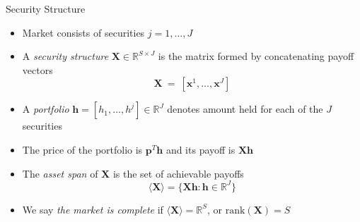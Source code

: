 \documentclass[aspectratio=1610]{beamer}
\newcommand{\eq}{\ =\ }
\newcommand{\bb}{\mathbb}
\begin{document}
\begin{frame}{Security Structure}
  \begin{itemize}
    \item Market consists of securities $j=1,\dots,J$
    \item A {\em security structure} $\bm X\in\bb R^{S\times J}$ is the matrix formed by concatenating payoff vectors
    $$\bm X \eq [\bm x^1, \dots, \bm x^J]$$

    \item A {\em portfolio} $\bm h = [h_1, \dots, h^j] \in \bb R^J$ denotes amount held for each of the $J$ securities
    \item The price of the portfolio is $\bm p^T \bm h$ and its payoff is $\bm{Xh}$
    \item The {\em asset span} of $\bm X$ is the set of achievable payoffs
    \begin{equation}
      \langle\bm X\rangle = \{\bm{Xh}: \bm h \in \bb R^J\}
    \end{equation}

    \item We say {\em the market is complete} if $\langle\bm X\rangle=\bb R^S$, or $\text{rank}(\bm X) = S$
  \end{itemize}
\end{frame}
\end{document}
